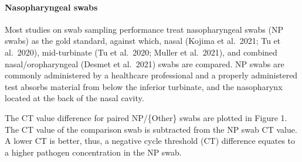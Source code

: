 \documentclass[
  letterpaper,
  DIV=11,
  numbers=noendperiod]{scrartcl}
\let\oldparagraph\paragraph
\renewcommand{\paragraph}[1]{\oldparagraph{#1}\mbox{}}
\begin{document}
\paragraph{Nasopharyngeal swabs}\label{nasopharyngeal-swabs}

Most studies on swab sampling performance treat nasopharyngeal swabs (NP
swabs) as the gold standard, against which, nasal (Kojima et al.~2021;
Tu et al.~2020), mid-turbinate (Tu et al.~2020; Muller et al.~2021), and
combined nasal/oropharyngeal (Desmet et al.~2021) swabs are compared. NP
swabs are commonly administered by a healthcare professional and a
properly administered test absorbs material from below the inferior
turbinate, and the nasopharynx located at the back of the nasal cavity.

The CT value difference for paired NP/\{Other\} swabs are plotted in
Figure 1. The CT value of the comparison swab is subtracted from the NP
swab CT value. A lower CT is better, thus, a negative cycle threshold
(CT) difference equates to a higher pathogen concentration in the NP
swab.
\end{document}

